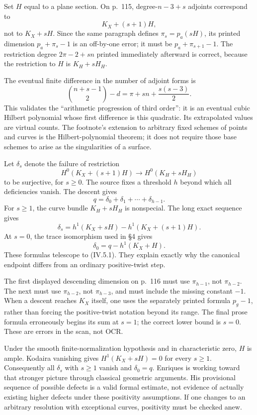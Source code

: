 Set \(H\) equal to a plane section. On p.~115, degree-\(n-3+s\) adjoints correspond to \[
 K_X+(s+1)H,
\] not to \(K_X+sH\). Since the same paragraph defines \(\pi_s=p_a(sH)\), its printed dimension \(p_a+\pi_s-1\) is an off-by-one error; it must be \(p_a+\pi_{s+1}-1\). The restriction degree \(2\pi-2+sn\) printed immediately afterward is correct, because the restriction to \(H\) is \(K_H+sH_H\).

The eventual finite difference in the number of adjoint forms is \[
 \binom{n+s-1}{2}-d
 =\pi+sn+\frac{s(s-3)}2.
\] This validates the ``arithmetic progression of third order'': it is an eventual cubic Hilbert polynomial whose first difference is this quadratic. Its extrapolated values are virtual counts. The footnote's extension to arbitrary fixed schemes of points and curves is the Hilbert-polynomial theorem; it does not require those base schemes to arise as the singularities of a surface.

Let \(\delta_s\) denote the failure of restriction \[
 H^0(K_X+(s+1)H)\longrightarrow H^0(K_H+sH_H)
\] to be surjective, for \(s\geq0\). The source fixes a threshold \(h\) beyond which all deficiencies vanish. The descent gives \[
 q=\delta_0+\delta_1+\cdots+\delta_{h-1}.
 \tag{IV.5.1}
\] For \(s\geq1\), the curve bundle \(K_H+sH_H\) is nonspecial. The long exact sequence gives \[
 \delta_s=h^1(K_X+sH)-h^1(K_X+(s+1)H).
\] At \(s=0\), the trace isomorphism used in §4 gives \[
 \delta_0=q-h^1(K_X+H).
\] These formulas telescope to (IV.5.1). They explain exactly why the canonical endpoint differs from an ordinary positive-twist step.

The first displayed descending dimension on p.~116 must use \(\pi_{h-1}\), not \(\pi_{h-2}\). The next must use \(\pi_{h-2}\), not \(\pi_{h-3}\), and must include the missing constant \(-1\). When a descent reaches \(K_X\) itself, one uses the separately printed formula \(p_g-1\), rather than forcing the positive-twist notation beyond its range. The final prose formula erroneously begins its sum at \(s=1\); the correct lower bound is \(s=0\). These are errors in the scan, not OCR.

Under the smooth finite-normalization hypothesis and in characteristic zero, \(H\) is ample. Kodaira vanishing gives \(H^1(K_X+sH)=0\) for every \(s\geq1\). Consequently all \(\delta_s\) with \(s\geq1\) vanish and \(\delta_0=q\). Enriques is working toward that stronger picture through classical geometric arguments. His provisional sequence of possible defects is a valid formal estimate, not evidence of actually existing higher defects under these positivity assumptions. If one changes to an arbitrary resolution with exceptional curves, positivity must be checked anew.


